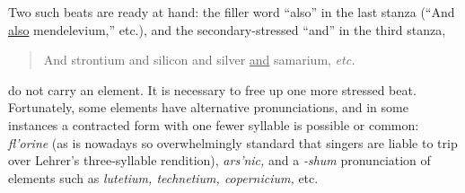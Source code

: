 \documentclass{article}
\begin{document}
Two such beats are ready at hand: the filler word ``also'' in the last stanza (``And \underline{also} mendelevium,'' etc.), and the secondary-stressed ``and'' in the third stanza,
\begin{verse}
  And strontium and silicon and silver \underline{and} samarium, \emph{etc.}\\
\end{verse}
do not carry an element. It is necessary to free up one more stressed beat. Fortunately, some elements have alternative pronunciations, and in some instances a contracted form with one fewer syllable is possible or common: \emph{fl'orine} (as is nowadays so overwhelmingly standard that singers are liable to trip over Lehrer's three-syllable rendition), \emph{ars'nic,} and a \emph{-shum} pronunciation of elements such as \emph{lutetium, technetium, copernicium,} etc.

\end{document}

